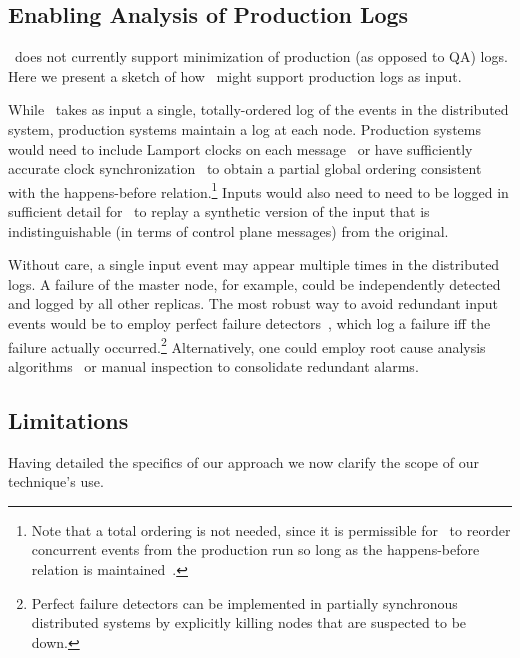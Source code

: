 \subsection{Enabling Analysis of Production Logs}
\label{subsec:production_logs}

\projectname~does not currently support minimization of production (as opposed
to QA) logs.
Here we present a sketch of how \projectname~might support production logs as input.

While \simulator~takes as input a single, totally-ordered log of the events in the
distributed system, production systems maintain a log at each node.
Production systems would need to include Lamport
clocks on each message~\cite{Lamport:1978:TCO:359545.359563} or have
sufficiently accurate clock
synchronization~\cite{corbett2012spanner} to obtain a partial global ordering
consistent with the happens-before relation.\footnote{
Note that a total ordering is not needed, since it is permissible
for \simulator~to reorder concurrent events from
the production run so long as the happens-before relation is
maintained~\cite{Fischer:1985:IDC:3149.214121}.} Inputs would also
need to need to be logged in sufficient detail for \projectname~to
replay a synthetic version of the input that is indistinguishable (in terms
of control plane messages) from the original.

Without care, a single input event may appear multiple times in the
distributed logs. A failure of the master node, for example, could be independently
detected and logged by all other replicas. The most robust way to
avoid redundant input events would be to employ perfect failure
detectors~\cite{chandra1996unreliable}, which log a failure iff
the failure actually occurred.\footnote{Perfect failure detectors can be
implemented in partially synchronous distributed systems by explicitly killing
nodes that are suspected to be down.} %
Alternatively, one
could employ root cause analysis
algorithms~\cite{yemini1996} or manual inspection to consolidate redundant
alarms.

\subsection{Limitations}
\label{subsec:non_goals}

Having detailed the specifics of our approach we now
clarify the scope of our technique's use.

